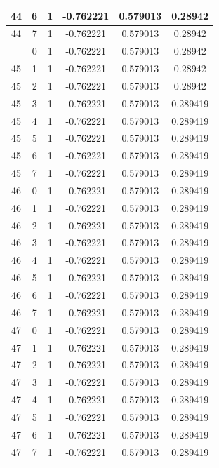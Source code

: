 \documentclass[12pt,a4paper]{article}
\numberwithin{equation}{section}
\numberwithin{figure}{section}
\numberwithin{table}{section}
\begin{document}
\begin{longtable}{|c|c|c|c|c|c|}
44 & 6 & 1 & -0.762221 & 0.579013 & 0.28942 \\ \hline
44 & 7 & 1 & -0.762221 & 0.579013 & 0.28942 \\ \hline
\pagebreak
45 & 0 & 1 & -0.762221 & 0.579013 & 0.28942 \\ \hline
45 & 1 & 1 & -0.762221 & 0.579013 & 0.28942 \\ \hline
45 & 2 & 1 & -0.762221 & 0.579013 & 0.28942 \\ \hline
45 & 3 & 1 & -0.762221 & 0.579013 & 0.289419 \\ \hline
45 & 4 & 1 & -0.762221 & 0.579013 & 0.289419 \\ \hline
45 & 5 & 1 & -0.762221 & 0.579013 & 0.289419 \\ \hline
45 & 6 & 1 & -0.762221 & 0.579013 & 0.289419 \\ \hline
45 & 7 & 1 & -0.762221 & 0.579013 & 0.289419 \\ \hline
46 & 0 & 1 & -0.762221 & 0.579013 & 0.289419 \\ \hline
46 & 1 & 1 & -0.762221 & 0.579013 & 0.289419 \\ \hline
46 & 2 & 1 & -0.762221 & 0.579013 & 0.289419 \\ \hline
46 & 3 & 1 & -0.762221 & 0.579013 & 0.289419 \\ \hline
46 & 4 & 1 & -0.762221 & 0.579013 & 0.289419 \\ \hline
46 & 5 & 1 & -0.762221 & 0.579013 & 0.289419 \\ \hline
46 & 6 & 1 & -0.762221 & 0.579013 & 0.289419 \\ \hline
46 & 7 & 1 & -0.762221 & 0.579013 & 0.289419 \\ \hline
47 & 0 & 1 & -0.762221 & 0.579013 & 0.289419 \\ \hline
47 & 1 & 1 & -0.762221 & 0.579013 & 0.289419 \\ \hline
47 & 2 & 1 & -0.762221 & 0.579013 & 0.289419 \\ \hline
47 & 3 & 1 & -0.762221 & 0.579013 & 0.289419 \\ \hline
47 & 4 & 1 & -0.762221 & 0.579013 & 0.289419 \\ \hline
47 & 5 & 1 & -0.762221 & 0.579013 & 0.289419 \\ \hline
47 & 6 & 1 & -0.762221 & 0.579013 & 0.289419 \\ \hline
47 & 7 & 1 & -0.762221 & 0.579013 & 0.289419 \\ \hline
	\end{longtable}
	
	\clearpage
	
\end{document}

